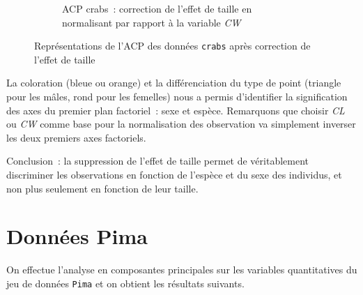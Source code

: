 \documentclass[a4paper,11pt]{report}
\begin{document}
\begin{figure}[H]
\begin{subfigure}[b]{0.5\linewidth}
		\caption{\scriptsize ACP crabs~: correction de l'effet de taille en normalisant par rapport à la variable \textit{CW}}
		\label{fig:biplot_acp_crabs_corrected_CW}
	\end{subfigure}%
	\caption{
		\small Représentations de l'ACP des données \texttt{crabs} après correction de l'effet de taille
	}
	\label{fig:biplots_crabs_corrected}%
\end{figure}

La coloration (bleue ou orange) et la différenciation du type de point (triangle pour les mâles, rond pour les femelles) nous a permis d'identifier la signification des axes du premier plan factoriel~: sexe et espèce. Remarquons que choisir \textit{CL} ou \textit{CW} comme base pour la normalisation des observation va simplement inverser les deux premiers axes factoriels.


Conclusion~: la suppression de l'effet de taille permet de véritablement discriminer les observations en fonction de l'espèce et du sexe des individus, et non plus seulement en fonction de leur taille.

\section{Données Pima}
\label{sec:2_4_ACP_Pima}


On effectue l'analyse en composantes principales sur les variables quantitatives du jeu de données \texttt{Pima} et on obtient les résultats suivants.
\end{document}
